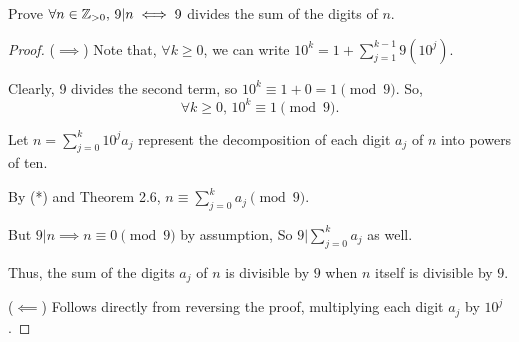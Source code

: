 \documentclass[../hw1]{subfiles}
\begin{document}
\begin{problem}[4]
Prove $\forall n \in \mathbb{Z}_{>0},\, 9|n \iff 9$ divides the sum of the digits of $n$.
\end{problem}
\begin{proof} ($\implies$)
	Note that, $\forall k \ge 0$, we can write $10^{k} = 1 + \sum_{j=1}^{k-1} 9(10^j)$.

	Clearly, 9 divides the second term, so $10^k\equiv 1 + 0 = 1 \pmod{9}$.
	So, \[
		\forall k \ge 0,\, 10^k\equiv 1 \pmod{9} \tag{*}
		.\]

	Let $n=\sum_{j=0}^{k}10^j a_j$ represent the decomposition of each digit $a_j$ of  $n$ into powers of ten.

	By (*) and Theorem 2.6, $n\equiv \sum_{j=0}^{k}a_j \pmod{9}$.

	But $9|n \implies n\equiv 0 \pmod{9}$ by assumption, So $9|\sum_{j=0}^{k}a_j$ as well.

	Thus, the sum of the digits $a_j$ of $n$ is divisible by $9$ when $n$ itself is divisible by $9$.

	($\impliedby$) Follows directly from reversing the proof, multiplying each digit $a_j$ by $10^j$.
\end{proof}
\end{document}
